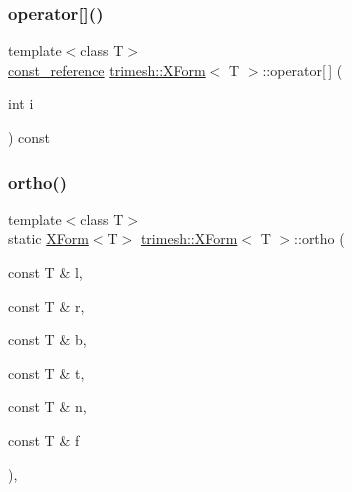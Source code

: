 \subsubsection{\texorpdfstring{operator[]()}{operator[]()}\hspace{0.1cm}{\footnotesize\ttfamily [4/4]}}
{\footnotesize\ttfamily template$<$class T$>$ \\
\hyperlink{classtrimesh_1_1XForm_a33bd450d8902f70aaf7d4bf9fec01502}{const\+\_\+reference} \hyperlink{classtrimesh_1_1XForm}{trimesh\+::\+X\+Form}$<$ T $>$\+::operator\mbox{[}$\,$\mbox{]} (\begin{DoxyParamCaption}\item[{int}]{i }\end{DoxyParamCaption}) const\hspace{0.3cm}{\ttfamily [inline]}}

\mbox{\label{classtrimesh_1_1XForm_a0b37576cdcaa04d09ef67cf30001ec99}} 
\subsubsection{\texorpdfstring{ortho()}{ortho()}}
{\footnotesize\ttfamily template$<$class T$>$ \\
static \hyperlink{classtrimesh_1_1XForm}{X\+Form}$<$T$>$ \hyperlink{classtrimesh_1_1XForm}{trimesh\+::\+X\+Form}$<$ T $>$\+::ortho (\begin{DoxyParamCaption}\item[{const T \&}]{l,  }\item[{const T \&}]{r,  }\item[{const T \&}]{b,  }\item[{const T \&}]{t,  }\item[{const T \&}]{n,  }\item[{const T \&}]{f }\end{DoxyParamCaption})\hspace{0.3cm}{\ttfamily [inline]}, {\ttfamily [static]}}

\mbox{\label{classtrimesh_1_1XForm_add75d061572109455654f6c396e912c6}} 
